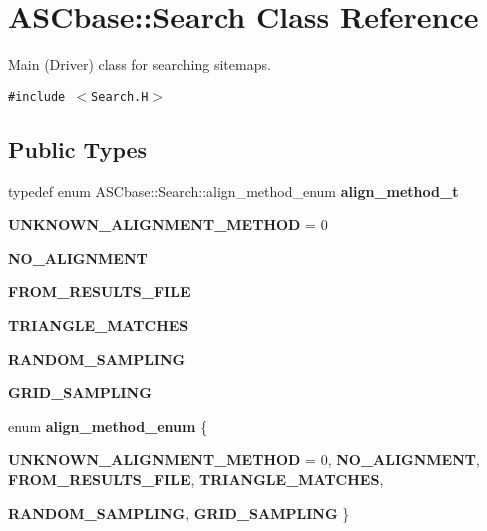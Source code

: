 \section{ASCbase::Search Class Reference}
\label{classASCbase_1_1Search}
Main (Driver) class for searching sitemaps.  


{\tt \#include $<$Search.H$>$}

\subsection*{Public Types}
\begin{CompactItemize}
\item 
typedef enum ASCbase::Search::align\_\-method\_\-enum \textbf{align\_\-method\_\-t}\label{classASCbase_1_1Search_a9a44b9d89721dd413afb8490f4183c3}

\item 
\textbf{UNKNOWN\_\-ALIGNMENT\_\-METHOD} = 0\label{classASCbase_1_1Search_809c94eeeb25e147aa08d2f815a789863082530b329b01a266cf0c1141717bf3}

\item 
\textbf{NO\_\-ALIGNMENT}\label{classASCbase_1_1Search_809c94eeeb25e147aa08d2f815a789866c54f67a19009c78bf649262c0340adb}

\item 
\textbf{FROM\_\-RESULTS\_\-FILE}\label{classASCbase_1_1Search_809c94eeeb25e147aa08d2f815a7898696fb54c9b28bf785753ffdf6dde83b51}

\item 
\textbf{TRIANGLE\_\-MATCHES}\label{classASCbase_1_1Search_809c94eeeb25e147aa08d2f815a7898638899be1fef1a8ff304fc9ce51878356}

\item 
\textbf{RANDOM\_\-SAMPLING}\label{classASCbase_1_1Search_809c94eeeb25e147aa08d2f815a789867516ae95f045b741fd84de2adc079724}

\item 
\textbf{GRID\_\-SAMPLING}\label{classASCbase_1_1Search_809c94eeeb25e147aa08d2f815a789865c39ba09fea0735bc5b06204c4251b7d}

\item 
enum \textbf{align\_\-method\_\-enum} \{ \par
\textbf{UNKNOWN\_\-ALIGNMENT\_\-METHOD} =  0, 
\textbf{NO\_\-ALIGNMENT}, 
\textbf{FROM\_\-RESULTS\_\-FILE}, 
\textbf{TRIANGLE\_\-MATCHES}, 
\par
\textbf{RANDOM\_\-SAMPLING}, 
\textbf{GRID\_\-SAMPLING}
 \}
\end{CompactItemize}
